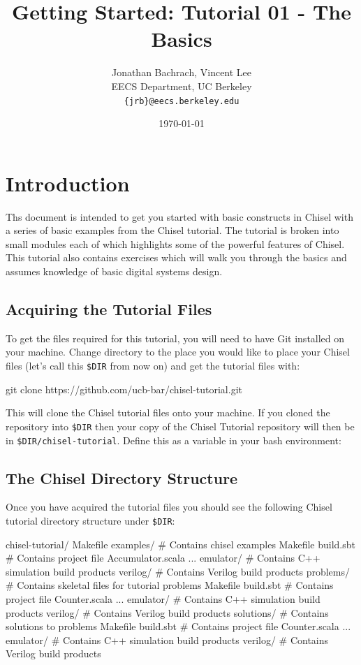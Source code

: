 \documentclass[twocolumn, 10pt]{article}
\title{Getting Started: Tutorial 01 - The Basics}
\author{Jonathan Bachrach, Vincent Lee \\
EECS Department, UC Berkeley\\
{\tt  \{jrb\}@eecs.berkeley.edu}
}
\date{\today}
\begin{document}
\maketitle{}

\section{Introduction}

Ths document is intended to get you started with basic constructs in Chisel with a series of basic examples from the Chisel tutorial.  The tutorial is broken into small modules each of which highlights some of the powerful features of Chisel. This tutorial also contains exercises which will walk you through the basics and assumes knowledge of basic digital systems design.

\subsection{Acquiring the Tutorial Files}

To get the files required for this tutorial, you will need to have Git installed on your machine. Change directory to the place you would like to place your Chisel files (let's call this \verb+$DIR+ from now on) and get the tutorial files with:

\begin{bash}
git clone https://github.com/ucb-bar/chisel-tutorial.git
\end{bash}

This will clone the Chisel tutorial files onto your machine. If you cloned the repository into \verb+$DIR+ then your copy of the Chisel Tutorial repository will then be in \verb+$DIR/chisel-tutorial+.  Define this as a variable in your bash environment:

\subsection{The Chisel Directory Structure}

Once you have acquired the tutorial files you should see the following Chisel tutorial directory structure under \verb+$DIR+:

\begin{bash}
chisel-tutorial/  
  Makefile
  examples/   # Contains chisel examples
    Makefile  
    build.sbt # Contains project file
    Accumulator.scala ...
    emulator/ # Contains C++ simulation build products
    verilog/  # Contains Verilog build products
  problems/   # Contains skeletal files for tutorial problems
    Makefile
    build.sbt # Contains project file
    Counter.scala ...
    emulator/ # Contains C++ simulation build products
    verilog/  # Contains Verilog build products
  solutions/  # Contains solutions to problems
    Makefile
    build.sbt # Contains project file
    Counter.scala ...
    emulator/ # Contains C++ simulation build products
    verilog/  # Contains Verilog build products
\end{bash}
\end{document}

